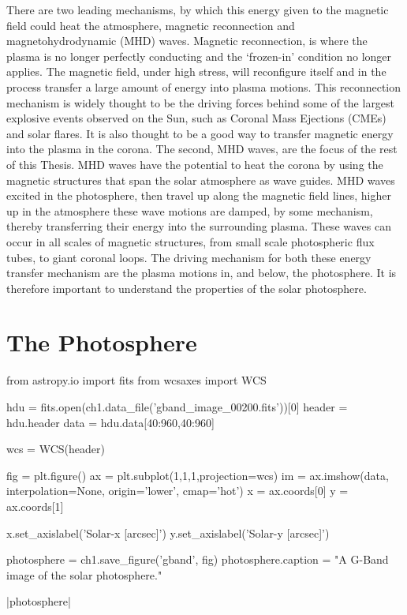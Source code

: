 There are two leading mechanisms, by which this energy given to the magnetic field could heat the atmosphere, magnetic reconnection and magnetohydrodynamic (MHD) waves.
Magnetic reconnection, is where the plasma is no longer perfectly conducting and the `frozen-in' condition no longer applies.
The magnetic field, under high stress, will reconfigure itself and in the process transfer a large amount of energy into plasma motions.
This reconnection mechanism is widely thought to be the driving forces behind some of the largest explosive events observed on the Sun, such as Coronal Mass Ejections (CMEs) and solar flares.
It is also thought to be a good way to transfer magnetic energy into the plasma in the corona.
The second, MHD waves, are the focus of the rest of this Thesis.
MHD waves have the potential to heat the corona by using the magnetic structures that span the solar atmosphere as wave guides.
MHD waves excited in the photosphere, then travel up along the magnetic field lines, higher up in the atmosphere these wave motions are damped, by some mechanism, thereby transferring their energy into the surrounding plasma.
These waves can occur in all scales of magnetic structures, from small scale photospheric flux tubes, to giant coronal loops.
The driving mechanism for both these energy transfer mechanism are the plasma motions in, and below, the photosphere.
It is therefore important to understand the properties of the solar photosphere.

\section{The Photosphere} 
\begin{pycode}[chapter1]
from astropy.io import fits
from wcsaxes import WCS

hdu = fits.open(ch1.data_file('gband_image_00200.fits'))[0]
header = hdu.header
data = hdu.data[40:960,40:960]

wcs = WCS(header)

fig = plt.figure()
ax = plt.subplot(1,1,1,projection=wcs)
im = ax.imshow(data, interpolation=None, origin='lower', cmap='hot')
x = ax.coords[0]
y = ax.coords[1]

x.set_axislabel('Solar-x [arcsec]')
y.set_axislabel('Solar-y [arcsec]')

photosphere = ch1.save_figure('gband', fig)
photosphere.caption = "A G-Band image of the solar photosphere."
\end{pycode}

\py[chapter1]|photosphere|

